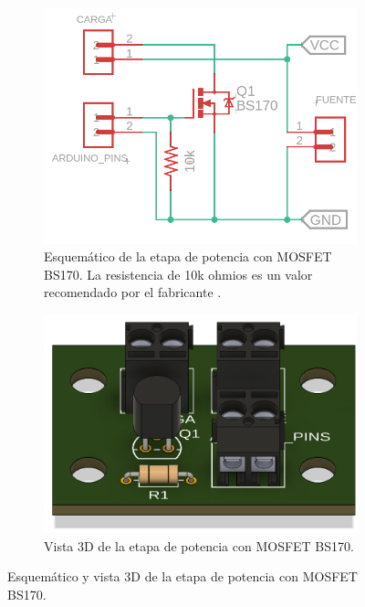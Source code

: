 \vspace{1 cm }

\begin{figure}[h]
    \centering
    \begin{subfigure}{0.45\textwidth}
        \centering
        \includegraphics[width=\linewidth]{Pictures/EtapaMosfet_Esquematico.png}
        \caption{Esquemático de la etapa de potencia con MOSFET BS170. La resistencia de 10k ohmios es un valor recomendado por el fabricante \cite{BS170Datasheet}.}
        \label{fig:Esquematico_powerstage170}
    \end{subfigure}
    \hfill
    \begin{subfigure}{0.45\textwidth}
        \centering
        \includegraphics[width=\linewidth]{Pictures/3D_MOSFET.png}
        \caption{Vista 3D de la etapa de potencia con MOSFET BS170.}
        \label{fig:3Do_powerstage170}
    \end{subfigure}
    \caption{Esquemático y vista 3D de la etapa de potencia con MOSFET BS170.}
    \label{fig:combined_figureBS170}
\end{figure}


